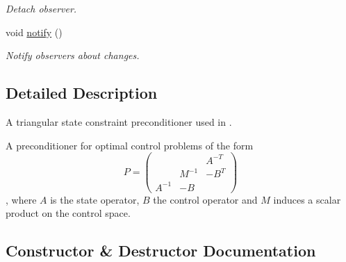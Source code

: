 \begin{DoxyCompactItemize}
\begin{DoxyCompactList}\small\item\em Detach observer. \end{DoxyCompactList}\item 
\hypertarget{classSpacy_1_1Mixin_1_1MixinConnection_a1ddeaa78a3bb4a38c2cca36d1f99fe36}{}void \hyperlink{classSpacy_1_1Mixin_1_1MixinConnection_a1ddeaa78a3bb4a38c2cca36d1f99fe36}{notify} ()\label{classSpacy_1_1Mixin_1_1MixinConnection_a1ddeaa78a3bb4a38c2cca36d1f99fe36}

\begin{DoxyCompactList}\small\item\em Notify observers about changes. \end{DoxyCompactList}\end{DoxyCompactItemize}


\subsection{Detailed Description}
A triangular state constraint preconditioner used in \cite{Lubkoll2015a}. 

A preconditioner for optimal control problems of the form \[ P=\left( \begin{array}{ccc} & & A^{-T} \\ & M^{-1} & -B^T \\ A^{-1} & -B & \end{array} \right)\], where $A$ is the state operator, $B$ the control operator and $M$ induces a scalar product on the control space. 

\subsection{Constructor \& Destructor Documentation}
\hypertarget{classSpacy_1_1CG_1_1TriangularStateConstraintPreconditioner_a8bbfa8bf7bdfcd3c308d4dbec8c448d0_a8bbfa8bf7bdfcd3c308d4dbec8c448d0}{}
